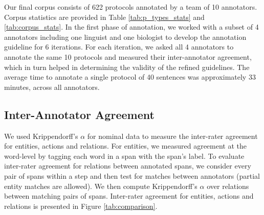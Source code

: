 \documentclass[11pt,a4paper]{article}
\begin{document}
Our final corpus consists of 622 protocols annotated by a team of 10 annotators. Corpus statistics are provided in Table \ref{tab:p_types_stats} and \ref{tab:corpus_stats}. In the first phase of annotation, we worked with a subset of 4 annotators including one linguist and one biologist to develop the annotation guideline for 6 iterations. For each iteration, we asked all 4 annotators to annotate the same 10 protocols and measured their inter-annotator agreement, which in turn helped in determining the validity of the refined guidelines. The average time to annotate a single protocol of 40 sentences was approximately 33 minutes, across all annotators. 




\subsection{Inter-Annotator Agreement}
We used Krippendorff's $\alpha$ for nominal data \cite{krippendorff2004content} to measure the inter-rater agreement for entities, actions and relations. For entities, we measured agreement at the word-level by tagging each word in a span with the span's label.  To evaluate inter-rater agreement for relations between annotated spans, we consider every pair of spans within a step and then test for matches between annotators (partial entity matches are allowed).   We then compute Krippendorff's $\alpha$ over relations between matching pairs of spans.  Inter-rater agreement for entities, actions and relations is presented in Figure \ref{tab:comparison}.


\end{document}
